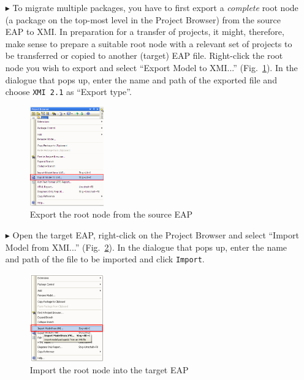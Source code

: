 \begin{enumerate}
\item[$\blacktriangleright$]
To migrate multiple packages, you have to first export a \emph{complete} root node (a package on the top-most level in the Project Browser) from the source EAP to XMI.
In preparation for a transfer of projects, it might, therefore, make sense to prepare a suitable root node with a relevant set of projects to be transferred or copied to another (target) EAP file.
Right-click the root node you wish to export and select ``Export Model to XMI...'' (Fig.~\ref{fig_projectMigration01}).
In the dialogue that pops up, enter the name and path of the exported file and choose \texttt{XMI 2.1} as ``Export type''.

\begin{figure}[htbp]
\begin{center}
  \includegraphics[width=0.3\textwidth]{pics/tricks/projectMigration/projectMigration1}
  \caption{Export the root node from the source EAP}  
  \label{fig_projectMigration01}
\end{center}
\end{figure}

\item[$\blacktriangleright$]
Open the target EAP, right-click on the Project Browser and select ``Import Model from XMI...'' (Fig.~\ref{fig_projectMigration03}). 
In the dialogue that pops up, enter the name and path of the file to be imported and click \texttt{Import}.

\begin{figure}[htbp]
\begin{center}
  \includegraphics[width=0.3\textwidth]{pics/tricks/projectMigration/projectMigration3}
  \caption{Import the root node into the target EAP}  
  \label{fig_projectMigration03}
\end{center}
\end{figure}
 

\end{enumerate}
